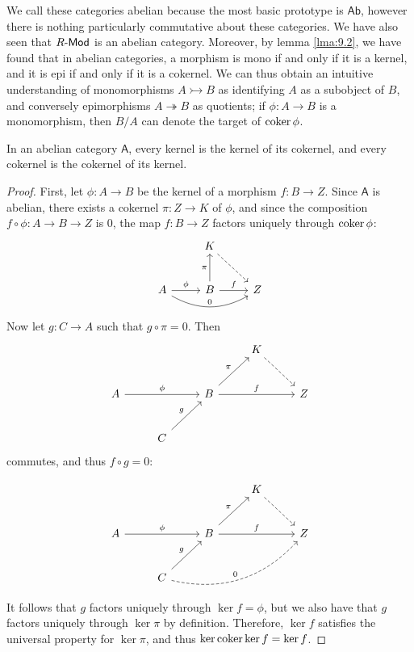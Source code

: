 We call these categories abelian because the most basic prototype is $\mathsf{Ab} $, however there is nothing particularly commutative about these categories. We have also seen that $R\text{-}\mathsf{Mod} $ is an abelian category. Moreover, by lemma \ref{lma:9.2}, we have found that in abelian categories, a morphism is mono if and only if it is a kernel, and it is epi if and only if it is a cokernel. We can thus obtain an intuitive understanding of monomorphisms $A\rightarrowtail B$ as identifying $A$ as a subobject of $B$, and conversely epimorphisms $A\twoheadrightarrow B$ as quotients; if $\phi : A \to B$ is a monomorphism, then $B/A$ can denote the target of $\operatorname{coker} \phi $.

\begin{lemma}\label{lma:9.4}
	In an abelian category $\mathsf{A} $, every kernel is the kernel of its cokernel, and every cokernel is the cokernel of its kernel.
\end{lemma}
\begin{proof}
	First, let $\phi : A \to B$ be the kernel of a morphism $f:B\to Z$. Since $\mathsf{A} $ is abelian, there exists a cokernel $\pi : Z \to K$ of $\phi $, and since the composition $f\circ \phi :A\to B\to Z$ is $0$, the map $f:B\to Z$ factors uniquely through $\operatorname{coker} \phi $:
	\[\begin{tikzcd}[row sep = 2.5em, column sep = 2.5em]
		&K\arrow[dr, dashed]\\
		A\arrow[r, "\phi "]\arrow[rr, bend right, "0"]&B\arrow[u, "\pi "]\arrow[r, "f"]&Z
	\end{tikzcd}\]
	Now let $g : C \to A$ such that $g\circ \pi=0$. Then 
	\[\begin{tikzcd}[row sep = 2.5em, column sep = 2.5em]
		&&&K\arrow[dr, dashed]\\
		A\arrow[rr, "\phi "]&&B\arrow[ur, "\pi "]\arrow[rr, "f"]&&Z\\
				    &C\arrow[ur, "g"]
	\end{tikzcd}\]
	commutes, and thus $f\circ g=0$:
	
	\[\begin{tikzcd}[row sep = 2.5em, column sep = 2.5em]
		&&&K\arrow[dr, dashed]\\
		A\arrow[rr, "\phi "]&&B\arrow[ur, "\pi "]\arrow[rr, "f"]&&Z\\
				    &C\arrow[ur, "g"]\arrow[urrr, dashed, bend right, "0"]
	\end{tikzcd}\]
	It follows that $g$ factors uniquely through $\ker f=\phi $, but we also have that $g$ factors uniquely through $\ker \pi $ by definition. Therefore, $\ker f$ satisfies the universal property for $\ker \pi $, and thus $\ker \operatorname{coker} \ker f=\ker f$.
\end{proof}

